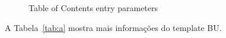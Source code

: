 \begin{figure}
    \caption{Table of Contents entry parameters}\label{fig:tocp}
\end{figure}




A Tabela~\ref{tab:a} mostra mais informações do template BU.

%
%
%
%
\clearpage
